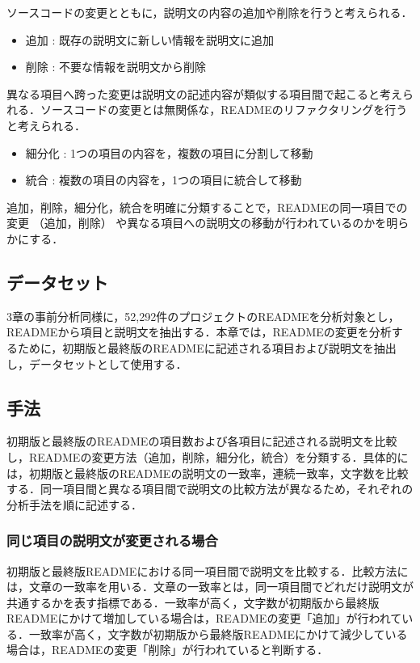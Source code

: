 \documentclass[submit]{ipsj}
\begin{document}
ソースコードの変更とともに，説明文の内容の追加や削除を行うと考えられる．
\begin{itemize}
  \item 追加 : 既存の説明文に新しい情報を説明文に追加
  \item 削除 : 不要な情報を説明文から削除
\end{itemize}

異なる項目へ跨った変更は説明文の記述内容が類似する項目間で起こると考えられる．ソースコードの変更とは無関係な，READMEのリファクタリングを行うと考えられる．
\begin{itemize}
  \item 細分化 : 1つの項目の内容を，複数の項目に分割して移動
  \item 統合 : 複数の項目の内容を，1つの項目に統合して移動
\end{itemize}


追加，削除，細分化，統合を明確に分類することで，READMEの同一項目での変更 （追加，削除） や異なる項目への説明文の移動が行われているのかを明らかにする．



\subsection{データセット}
3章の事前分析同様に，52,292件のプロジェクトのREADMEを分析対象とし，READMEから項目と説明文を抽出する．本章では，READMEの変更を分析するために，初期版と最終版のREADMEに記述される項目および説明文を抽出し，データセットとして使用する．




\subsection{手法}
初期版と最終版のREADMEの項目数および各項目に記述される説明文を比較し，READMEの変更方法（追加，削除，細分化，統合）を分類する．具体的には，初期版と最終版のREADMEの説明文の一致率，連続一致率，文字数を比較する．同一項目間と異なる項目間で説明文の比較方法が異なるため，それぞれの分析手法を順に記述する．


\subsubsection{同じ項目の説明文が変更される場合}
初期版と最終版READMEにおける同一項目間で説明文を比較する．比較方法には，文章の一致率を用いる．文章の一致率とは，同一項目間でどれだけ説明文が共通するかを表す指標である．一致率が高く，文字数が初期版から最終版READMEにかけて増加している場合は，READMEの変更「追加」が行われている．一致率が高く，文字数が初期版から最終版READMEにかけて減少している場合は，READMEの変更「削除」が行われていると判断する．
\end{document}
